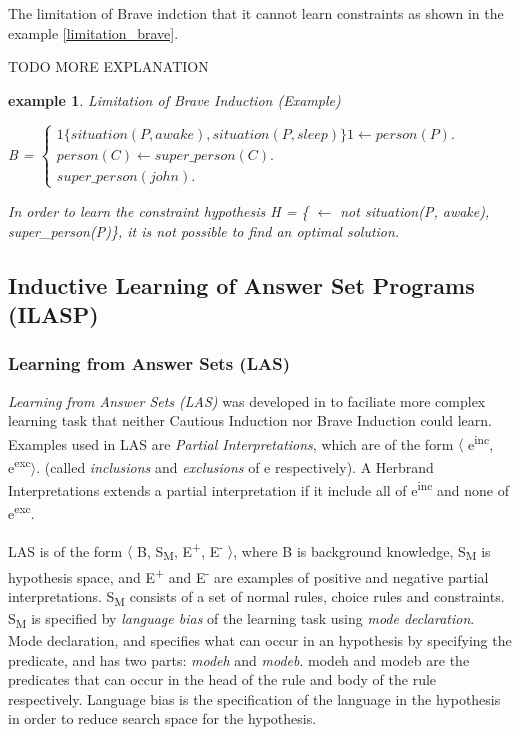 \documentclass[12pt,twoside]{report}
\newtheorem{examp}{example}[section]
\begin{document}
The limitation of Brave indction that it cannot learn constraints as shown in the example \ref{limitation_brave}.

TODO MORE EXPLANATION

\begin{examp} \normalfont Limitation of Brave Induction (Example)

B = $\begin{cases}
	1\{situation(P, awake), situation(P, sleep)\}1 \leftarrow person(P). \\
	person(C) \leftarrow super\_person(C). \\
	super\_person(john).
	\end{cases}$

In order to learn the  constraint hypothesis H = \{ $\leftarrow$ not situation(P, awake), super\_person(P)\}, it is not possible to find an optimal solution.
\end{examp}
\label{limitation_brave}

\subsection{Inductive Learning of Answer Set Programs (ILASP)}
\label{section_lasp}

\subsubsection{Learning from Answer Sets (LAS)}
\textit{Learning from Answer Sets (LAS)} was developed in \cite{Law2014} to faciliate more complex learning task that neither Cautious Induction nor Brave Induction could learn.
Examples used in LAS are \textit{Partial Interpretations}, which are of the form $\langle$ e\textsuperscript{inc}, e\textsuperscript{exc}$\rangle$. (called \textit{inclusions} and \textit{exclusions} of e respectively).  A Herbrand Interpretations extends a partial interpretation if it include all of e\textsuperscript{inc} and none of e\textsuperscript{exc}.

LAS is of the form $\langle$ B, S\textsubscript{M}, E\textsuperscript{+}, E\textsuperscript{-} $\rangle$, where B is background knowledge, S\textsubscript{M} is hypothesis space, and E\textsuperscript{+} and E\textsuperscript{-} are examples of positive and negative partial interpretations. S\textsubscript{M} consists of a set of normal rules, choice rules and constraints. S\textsubscript{M} is specified by \textit{language bias} of the learning task using \textit{mode declaration}. Mode declaration, and specifies what can occur in an hypothesis by specifying the predicate, and has two parts: \textit{modeh} and \textit{modeb}.  modeh and modeb are the predicates that can occur in the head of the rule and body of the rule respectively. Language bias is the specification of the language in the hypothesis in order to reduce search space for the hypothesis.
\end{document}
